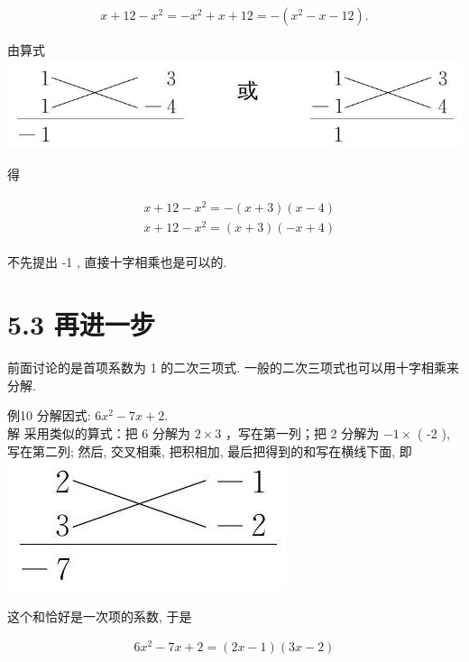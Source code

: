 \documentclass[10pt]{article}
\begin{document}
\begin{align*}
x+12-x^{2}=-x^{2}+x+12=-\left(x^{2}-x-12\right) .
\end{align*}

由算式\\
\includegraphics[max width=\textwidth, center]{2024_10_30_bd799899fef40368a068g-037}

得

\begin{align*}
\begin{aligned}
& x+12-x^{2}=-(x+3)(x-4) \\
& x+12-x^{2}=(x+3)(-x+4)
\end{aligned}
\end{align*}

不先提出 -1 , 直接十字相乘也是可以的.

\section*{5.3 再进一步}
前面讨论的是首项系数为 1 的二次三项式. 一般的二次三项式也可以用十字相乘来分解.

例10 分解因式: $6 x^{2}-7 x+2$.\\
解 采用类似的算式：把 6 分解为 $2 \times 3$ ，写在第一列；把 2 分解为 $-1 \times$ ( -2 ), 写在第二列; 然后, 交叉相乘, 把积相加, 最后把得到的和写在横线下面, 即\\
\includegraphics[max width=\textwidth, center]{2024_10_30_bd799899fef40368a068g-037(1)}

这个和恰好是一次项的系数, 于是

\begin{align*}
6 x^{2}-7 x+2=(2 x-1)(3 x-2)
\end{align*}
\end{document}
